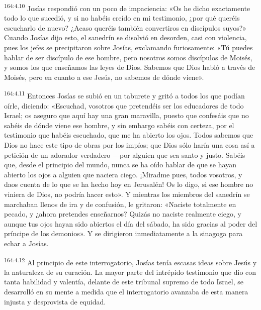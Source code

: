 \par 
\textsuperscript{164:4.10} Josías respondió con un poco de impaciencia: «Os he dicho exactamente todo lo que sucedió, y si no habéis creído en mi testimonio, ¿por qué queréis escucharlo de nuevo? ¿Acaso queréis también convertiros en discípulos suyos?» Cuando Josías dijo esto, el sanedrín se disolvió en desorden, casi con violencia, pues los jefes se precipitaron sobre Josías, exclamando furiosamente: «Tú puedes hablar de ser discípulo de ese hombre, pero nosotros somos discípulos de Moisés, y somos los que enseñamos las leyes de Dios. Sabemos que Dios habló a través de Moisés, pero en cuanto a ese Jesús, no sabemos de dónde viene».

\par 
\textsuperscript{164:4.11} Entonces Josías se subió en un taburete y gritó a todos los que podían oírle, diciendo: «Escuchad, vosotros que pretendéis ser los educadores de todo Israel; os aseguro que aquí hay una gran maravilla, puesto que confesáis que no sabéis de dónde viene ese hombre, y sin embargo sabéis con certeza, por el testimonio que habéis escuchado, que me ha abierto los ojos. Todos sabemos que Dios no hace este tipo de obras por los impíos; que Dios sólo haría una cosa así a petición de un adorador verdadero ---por alguien que sea santo y justo. Sabéis que, desde el principio del mundo, nunca se ha oído hablar de que se hayan abierto los ojos a alguien que naciera ciego. ¡Miradme pues, todos vosotros, y daos cuenta de lo que se ha hecho hoy en Jerusalén! Os lo digo, si ese hombre no viniera de Dios, no podría hacer esto». Y mientras los miembros del sanedrín se marchaban llenos de ira y de confusión, le gritaron: «Naciste totalmente en pecado, y ¿ahora pretendes enseñarnos? Quizás no naciste realmente ciego, y aunque tus ojos hayan sido abiertos el día del sábado, ha sido gracias al poder del príncipe de los demonios». Y se dirigieron inmediatamente a la sinagoga para echar a Josías.

\par 
\textsuperscript{164:4.12} Al principio de este interrogatorio, Josías tenía escasas ideas sobre Jesús y la naturaleza de su curación. La mayor parte del intrépido testimonio que dio con tanta habilidad y valentía, delante de este tribunal supremo de todo Israel, se desarrolló en su mente a medida que el interrogatorio avanzaba de esta manera injusta y desprovista de equidad.

